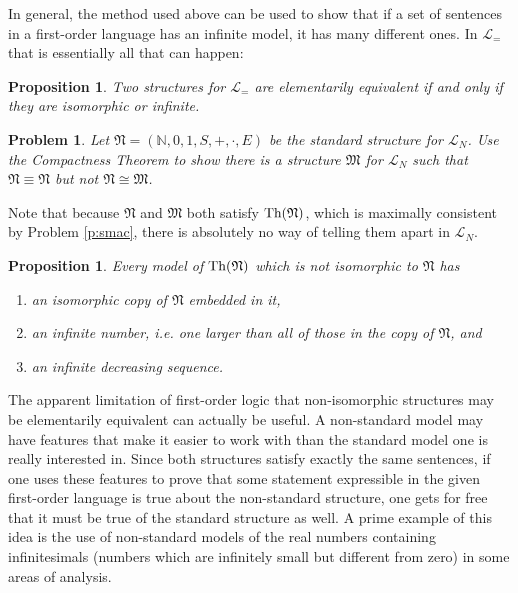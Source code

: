 \documentclass[12pt]{amsbook}
\theoremstyle{plain}
\newtheorem{prop}[thm]{Proposition}
\newtheorem{prob}[thm]{Problem}
\theoremstyle{definition}
\theoremstyle{remark}
\begin{document}
In general,  the method used above can be used to show that if a set of sentences in a first-order language has an infinite model,  it has many different ones.  In $\mathcal{L}_=$ that is essentially all that can happen:

\begin{prop} \label{p:nine5}
Two structures for $\mathcal{L}_=$ are elementarily equivalent if and only if they are isomorphic or infinite.
\end{prop}

\begin{prob} \label{p:nine6}
Let $\mathfrak{N} = (\mathbb{N}, 0, 1, S, +, \cdot, E)$ be the standard structure for $\mathcal{L}_N$.  Use the Compactness Theorem to show there is a structure $\mathfrak{M}$ for $\mathcal{L}_N$ such that $\mathfrak{N} \equiv \mathfrak{N}$ but not $\mathfrak{N} \cong \mathfrak{M}$.
\end{prob}

Note that because $\mathfrak{N}$ and $\mathfrak{M}$ both satisfy $\text{\rm Th}(\mathfrak{N})$,  which is maximally consistent by Problem \ref{p:smac},  there is absolutely no way of telling them apart in $\mathcal{L}_N$.

\begin{prop} \label{p:nine7}
Every model of $\text{\rm Th}(\mathfrak{N})$ which is {\em not\/} isomorphic to $\mathfrak{N}$ has
\begin{enumerate}
\item an isomorphic copy of $\mathfrak{N}$ embedded in it,
\item an infinite number,  {\em i.e.\/} one larger than all of those in the copy of $\mathfrak{N}$,  and
\item an infinite decreasing sequence.
\end{enumerate}
\end{prop}

The apparent limitation of first-order logic that non-isomorphic structures may be elementarily equivalent can actually be useful.  A non-standard model may have features that make it easier to work with than the standard model one is really interested in.  Since both structures satisfy exactly the same sentences,  if one uses these features to prove that some statement expressible in the given first-order language is true about the non-standard structure,  one gets for free that it must be true of the standard structure as well.  A prime example of this idea is the use of non-standard models of the real numbers containing infinitesimals (numbers which are infinitely small but different from zero) in some areas of analysis.
\end{document}
